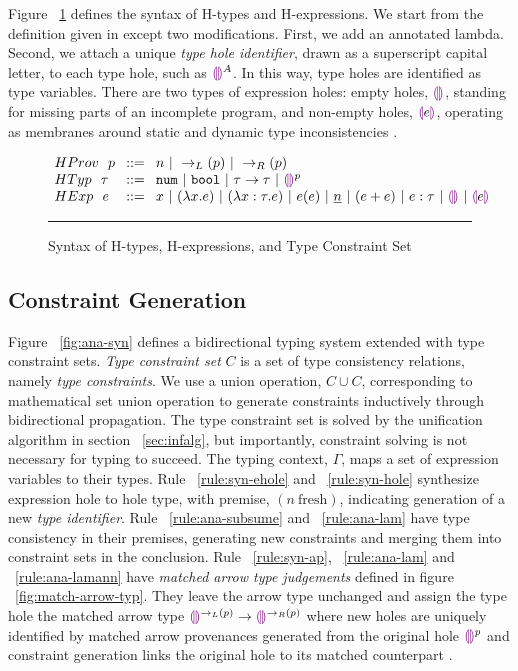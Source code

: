 \label{sec:typinf}
Figure ~\ref{fig:syntax_fig} defines the syntax of H-types and H-expressions. We start from the definition given in \citet{HazelnutPOPL} except two modifications. First, we add an annotated lambda. Second, we attach a unique \emph{type hole identifier}, drawn as a superscript capital letter, to each type hole, such as $\textcolor{violet}{\llparenthesis}\textcolor{violet}{\rrparenthesis}^A$. In this way, type holes are identified as type variables. There are two types of expression holes: empty holes, $\textcolor{violet}{\llparenthesis}\textcolor{violet}{\rrparenthesis}$, standing for missing parts of an incomplete program, and non-empty holes, $\textcolor{violet}{\llparenthesis} e \textcolor{violet}{\rrparenthesis}$, operating as membranes around static and dynamic type inconsistencies \cite{HazelLive}. \par
\begin{figure}[htbp]
\vspace{-3px} 
$\arraycolsep=4pt\begin{array}{lll}
HProv~~ p & ::= & 
    n ~\vert~ 
    \rightarrow_{L}(p) ~\vert~ 
    \rightarrow_{R}(p)
    \\
HTyp~~ \tau & ::= &
  \tnum ~\vert~
  \tbool ~\vert~
  \tarr{\tau}{\tau} ~\vert~
  \ehole^p
  \\
HExp~~ e & ::= &
  x ~\vert~
  \lamfunc{x}{e} ~\vert~
  \lamfunc{x:\tau}{e} ~\vert~
  e(e) ~\vert~
  \underlinenum{n} ~\vert~
  (e+e) ~\vert~
  e: \tau ~\vert~
  \ehole  ~\vert~
  \notehole{e} 
\end{array}$
\hrule
\caption{Syntax of H-types, H-expressions, and Type Constraint Set}
\label{fig:syntax_fig}
\vspace{-5px}
\end{figure}

\subsection{Constraint Generation}
Figure ~\ref{fig:ana-syn} defines a bidirectional typing system extended with type constraint sets. \emph{Type constraint set} $C$ is a set of type consistency relations, namely \emph{type constraints}. We use a union operation, $C \cup C$, corresponding to mathematical set union operation to generate constraints inductively through bidirectional propagation. The type constraint set is solved by the unification algorithm in section ~\ref{sec:infalg}, but importantly, constraint solving is not necessary for typing to succeed. The typing context, $\Gamma$, maps a set of expression variables to their types. Rule ~\ref{rule:syn-ehole} and ~\ref{rule:syn-hole} synthesize expression hole to hole type, with premise, $(n ~ \text{fresh})$, indicating generation of a new \emph{type identifier}. Rule ~\ref{rule:ana-subsume} and ~\ref{rule:ana-lam} have type consistency in their premises, generating new constraints and merging them into constraint sets in the conclusion. Rule ~\ref{rule:syn-ap}, ~\ref{rule:ana-lam} and ~\ref{rule:ana-lamann} have \emph{matched arrow type judgements} defined in figure ~\ref{fig:match-arrow-typ}. They leave the arrow type unchanged and assign the type hole the matched arrow type $\textcolor{violet}{\llparenthesis}\textcolor{violet}{\rrparenthesis}^{\rightarrow_{L}(p)} \rightarrow \textcolor{violet}{\llparenthesis}\textcolor{violet}{\rrparenthesis}^{\rightarrow_{R}(p)}$ where new holes are uniquely identified by matched arrow provenances generated from the original hole $\textcolor{violet}{\llparenthesis}\textcolor{violet}{\rrparenthesis}^{p}$ and constraint generation links the original hole to its matched counterpart \cite{HazelnutPOPL}.

